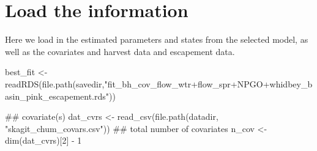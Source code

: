 \documentclass[11pt,]{article}
\newenvironment{Shaded}{}{}
\newcommand{\KeywordTok}[1]{\textcolor[rgb]{0.00,0.00,1.00}{#1}}
\newcommand{\DecValTok}[1]{#1}
\newcommand{\StringTok}[1]{\textcolor[rgb]{0.00,0.50,0.50}{#1}}
\newcommand{\OtherTok}[1]{\textcolor[rgb]{1.00,0.25,0.00}{#1}}
\newcommand{\OperatorTok}[1]{#1}
\newcommand{\NormalTok}[1]{#1}
\begin{document}
\section{Load the information}\label{load-the-information}

Here we load in the estimated parameters and states from the selected
model, as well as the covariates and harvest data and escapement data.

\begin{Shaded}
\begin{Highlighting}[]
\NormalTok{best_fit <-}\StringTok{ }\KeywordTok{readRDS}\NormalTok{(}\KeywordTok{file.path}\NormalTok{(savedir,}\StringTok{"fit_bh_cov_flow_wtr+flow_spr+NPGO+whidbey_basin_pink_escapement.rds"}\NormalTok{))}
\end{Highlighting}
\end{Shaded}

\begin{Shaded}
\begin{Highlighting}[]
\NormalTok{## covariate(s)}
\NormalTok{dat_cvrs <-}\StringTok{ }\KeywordTok{read_csv}\NormalTok{(}\KeywordTok{file.path}\NormalTok{(datadir, }\StringTok{"skagit_chum_covars.csv"}\NormalTok{))}
\NormalTok{## total number of covariates}
\NormalTok{n_cov <-}\StringTok{ }\KeywordTok{dim}\NormalTok{(dat_cvrs)[}\DecValTok{2}\NormalTok{] }\OperatorTok{-}\StringTok{ }\DecValTok{1}
\end{Highlighting}
\end{Shaded}

\begin{Shaded}
\end{Shaded}
\end{document}
